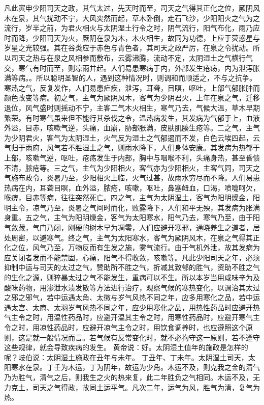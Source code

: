 \documentclass[12pt,UTF8]{ctexbook}
\begin{document}
凡此寅申少阳司天之政，其气太过，先天时而至，司天之气得其正化之位，厥阴风木在泉，其气扰动不宁，大风突然而起，草木卧倒，走石飞沙，少阳阳火之气为之流行，岁半之前，为君火相火与太阴湿土行令之时，阴气流行，阳气布化，雨乃应时而降，少阳司天为火，厥阴在泉为木，木火相生，故同为功德，上应于荧惑星与岁星之光较强。其在谷类应于赤色与青色者，其司天之政严厉，在泉之令扰动。所以司天之热与在泉之风相参而敷布，云雾沸腾，流动不定，太阴湿土之气横行气交，寒气有时而至，则凉雨并起。人们易患寒病于内，外部发生疮疡，内为泄泻胀满等病。。所以聪明圣智的人，遇到这种情况时，则调和而顺适之，不与之抗争。寒热之气，反复发作，人们易患疟疾，泄泻，耳聋，目瞑，呕吐，上部气郁胀肿而颜色改变等病。初之气，主气为厥阴风木，客气为少阴君火，上年在泉之气，迁移退位，风气盛时则摇动不宁，主客二气木火相生，寒气乃去，气候大温，草木早期繁荣。有时寒气虽来但不能行其杀伐之令，温热病发生，其发病为气郁于上，血液外溢，目赤，咳嗽气逆，头痛，血崩，胁部胀满，皮肤肌腠生疮等。二之气，主气为少阴君火，客气为太阴湿土，火气反为湿土之气郁遏而不发，白色云埃四起，云气归于雨府，风气若不胜湿土之气，则雨水降下，人们身体安康。其发病为热郁于上部，咳嗽气逆，呕吐，疮疡发生于内部，胸中与咽喉不利，头痛身热，甚至昏愦不清，脓疮等。三之气，主气为少阳相火，客气亦为少阳相火，主客气同，司天之气施布政令，炎暑乃至，少阳相火上临，火气过甚，故雨水穷尽而不降。人们易患热病在内，耳聋目瞑，血外溢，脓疮，咳嗽，呕吐，鼻塞衄血，口渴，喷嚏呵欠，喉痹，目赤等病，往往突然死亡。四之气，主气为太阴湿土，客气为阳明燥金，阳明主令，凉气乃至，炎暑之气间时而化，败露降下，人们和平无殃，其发病为胀满身重。五之气，主气为阳明燥金，客气为太阳寒水，阳气乃去，寒气乃至，由于阳气敛藏，气门乃闭，刚硬的树木早为凋零，人们应避开寒邪，通晓养生之道者，居处周密，以避寒气。终之气，主气为太阳寒水，客气为厥阴风木，在泉之气得其正化之位，风气乃至，万物反而有生发之施，雾气流行。由于气机外泄，故其发病为应关闭者发而不能禁固，心痛，阳气不得收敛，咳嗽等。凡此少阳司天之年，必须抑制中运与司天的太过之气，赞助所不胜之气，折减其致郁的胜气，资助不胜之气的生化之源，则猝暴太过之气不能发生，重病可以不生。所以本岁当用咸味辛为及酸味药物，用渗泄水渍发散等方法进行治疗，观察气候的寒热变化，以调治其太过之邪之邪气，若中运遇太角、太徽与岁气风热不同之年，应多用寒化之品，若中运遇太宫、太商、太羽岁气风热不同之年，应少用寒化之品，用热性药品时应避开热气主令之时，用温性药品时，应避开温其主令之时，用寒性药品时，应避开寒气主令之时，用凉性药品时，应避开凉气主令之时，用饮食调养时，也应遵照这个原则，这是就一般情况而言。若气候有反常变化时，就不必拘守这一原则，若不遵守这些规律，就会导致疾病的发生。
黄帝说：好。太阴湿土值年的施政是怎样的呢？岐伯说：太阴湿土施政在丑年与未年。
丁丑年、丁未年。太阴湿土司天，太阳寒水在泉。丁壬为木运，丁为阴年，故运为少角。木运不及，则克我之金的清气乃为胜气，清气之后，则我生之火的热来复，此二年胜负之气相同。木运不及，无力克土，司天之气得政，故同土运平气。凡次二年，运气为风，胜气为清，复气为热。
\end{document}
